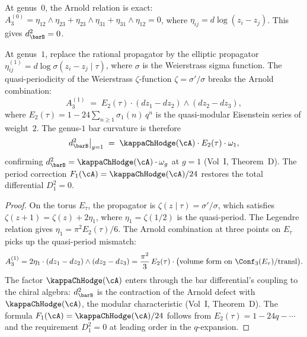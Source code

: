 \begin{proposition}
\label{prop:genus-1-arnold-defect}
At genus~$0$, the Arnold relation is exact:
$A_3^{(0)} = \eta_{12} \wedge \eta_{23}
 + \eta_{23} \wedge \eta_{31}
 + \eta_{31} \wedge \eta_{12} = 0$,
where $\eta_{ij} = d\log(z_i - z_j)$. This gives
$d_{\barB}^2 = 0$.

At genus~$1$, replace the rational propagator by the elliptic
propagator $\eta_{ij}^{(1)} = d\log\sigma(z_i - z_j \mid \tau)$,
where $\sigma$ is the Weierstrass sigma function. The
quasi-periodicity of the Weierstrass $\zeta$-function
$\zeta = \sigma'/\sigma$ breaks the Arnold combination:
\begin{equation}
\label{eq:genus-1-arnold-defect}
 A_3^{(1)}
 \;=\;
 E_2(\tau) \cdot
 (dz_1 - dz_2) \wedge (dz_2 - dz_3),
\end{equation}
where $E_2(\tau) = 1 - 24\sum_{n \geq 1} \sigma_1(n)\,q^n$
is the quasi-modular Eisenstein series of weight~$2$.
The genus-$1$ bar curvature is therefore
\begin{equation}
\label{eq:genus-1-bar-curvature}
 d_{\barB}^2\big|_{g=1}
 \;=\;
 \kappaChHodge(\cA) \cdot E_2(\tau) \cdot \omega_1,
\end{equation}
confirming\/ $d_{\barB}^2 = \kappaChHodge(\cA) \cdot \omega_g$ at\/ $g = 1$
\textup{(}Vol~I, Theorem~D\textup{)}. The period correction
$F_1(\cA) = \kappaChHodge(\cA)/24$ restores the total differential
$D_1^2 = 0$.
\end{proposition}

\begin{proof}
On the torus $E_\tau$, the propagator is
$\zeta(z \mid \tau) = \sigma'/\sigma$, which satisfies
$\zeta(z + 1) = \zeta(z) + 2\eta_1$, where
$\eta_1 = \zeta(1/2)$ is the quasi-period. The Legendre
relation gives $\eta_1 = \pi^2 E_2(\tau)/6$. The Arnold
combination at three points on $E_\tau$ picks up the
quasi-period mismatch:
\[
 A_3^{(1)}
 = 2\eta_1 \cdot (dz_1 - dz_2) \wedge (dz_2 - dz_3)
 = \frac{\pi^2}{3}\,E_2(\tau) \cdot \bigl(
 \text{volume form on } \Conf_3(E_\tau)/\mathrm{transl}
 \bigr).
\]
The factor $\kappaChHodge(\cA)$ enters through the bar differential's
coupling to the chiral algebra: $d_{\barB}^2$ is the
contraction of the Arnold defect with $\kappaChHodge(\cA)$, the
modular characteristic (Vol~I, Theorem~D). The formula
$F_1(\cA) = \kappaChHodge(\cA)/24$ follows from
$E_2(\tau) = 1 - 24q - \cdots$ and the requirement $D_1^2 = 0$
at leading order in the $q$-expansion.
\end{proof}


